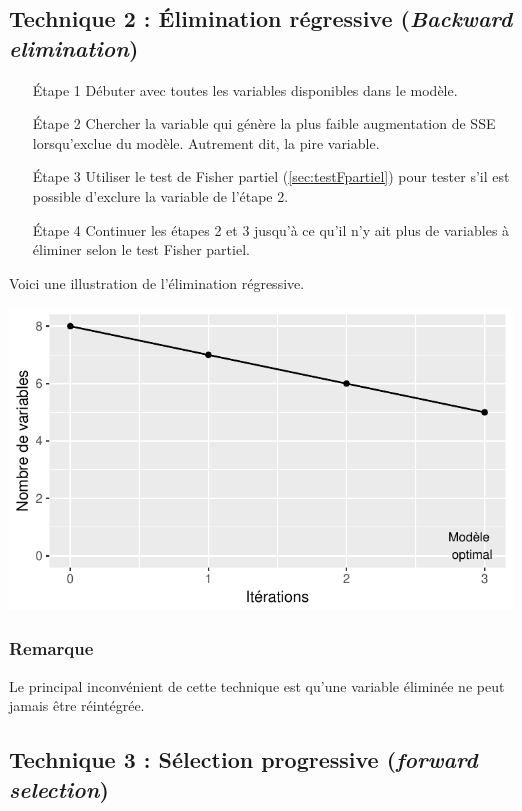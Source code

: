 \documentclass[11pt,french]{report}
\begin{document}
\subsection{Technique 2 : Élimination régressive (\emph{Backward elimination})}
\label{tech2}

\begin{itemize}
\item [Étape 1] Débuter avec toutes les variables disponibles dans le modèle.

\item [Étape 2] Chercher la variable qui génère la plus faible augmentation de SSE lorsqu'exclue du modèle. Autrement dit, la pire variable.

\item [Étape 3] Utiliser le test de Fisher partiel (\ref{sec:testFpartiel}) pour tester s'il est possible d'exclure la variable de l'étape 2.

\item [Étape 4] Continuer les étapes 2 et 3 jusqu'à ce qu'il n'y ait plus de variables à éliminer selon le test Fisher partiel.
\end{itemize}
\bigskip

Voici une illustration de l'élimination régressive.

\includegraphics{notes_de_cours-026}

\subsubsection*{Remarque}
Le principal inconvénient de cette technique est qu'une variable éliminée ne peut jamais être réintégrée. 

\subsection{Technique 3 : Sélection progressive (\emph{forward selection})}
\label{tech3}
\end{document}
